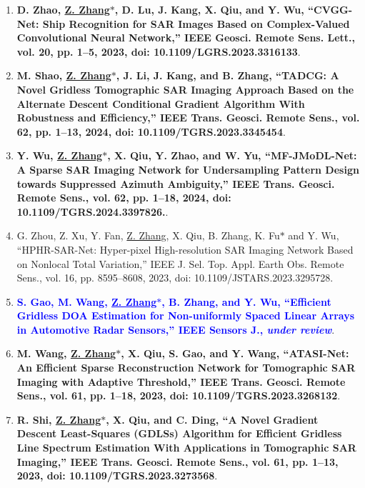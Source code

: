 \documentclass[paper=a4,fontsize=11pt]{scrartcl}
\begin{document}
\begin{enumerate}

\item \textbf{D. Zhao, \underline{Z. Zhang$\ast$}, D. Lu, J. Kang, X. Qiu, and Y. Wu, ``CVGG-Net: Ship Recognition for SAR Images Based on Complex-Valued Convolutional Neural Network,'' IEEE Geosci. Remote Sens. Lett., vol. 20, pp. 1–5, 2023, doi: 10.1109/LGRS.2023.3316133}.​

\item \textbf{M. Shao, \underline{Z. Zhang$\ast$}, J. Li, J. Kang, and B. Zhang, ``TADCG: A Novel Gridless Tomographic SAR Imaging Approach Based on the Alternate Descent Conditional Gradient Algorithm With Robustness and Efficiency,'' IEEE Trans. Geosci. Remote Sens., vol. 62, pp. 1–13, 2024, doi: 10.1109/TGRS.2023.3345454}.

\item \textbf{Y. Wu, \underline{Z. Zhang$\ast$}, X. Qiu, Y. Zhao, and W. Yu, ``MF-JMoDL-Net: A Sparse SAR Imaging Network for Undersampling Pattern Design towards Suppressed Azimuth Ambiguity,'' IEEE Trans. Geosci. Remote Sens., vol. 62, pp. 1–18, 2024, doi: 10.1109/TGRS.2024.3397826.}.

\item G. Zhou, Z. Xu, Y. Fan, \underline{Z. Zhang}, X. Qiu, B. Zhang, K. Fu$\ast$ and Y. Wu, ``HPHR-SAR-Net: Hyper-pixel High-resolution SAR Imaging Network Based on Nonlocal Total Variation,'' IEEE J. Sel. Top. Appl. Earth Obs. Remote Sens., vol. 16, pp. 8595–8608, 2023, doi: 10.1109/JSTARS.2023.3295728.

\item \textcolor{blue}{\textbf{S. Gao, M. Wang, \underline{Z. Zhang$\ast$}, B. Zhang, and Y. Wu, ``Efficient Gridless DOA Estimation for Non-uniformly Spaced Linear Arrays in Automotive Radar Sensors,'' IEEE Sensors J., \emph{under review}}}.

\item \textbf{M. Wang, \underline{Z. Zhang$\ast$}, X. Qiu, S. Gao, and Y. Wang, ``ATASI-Net: An Efficient Sparse Reconstruction Network for Tomographic SAR Imaging with Adaptive Threshold,'' IEEE Trans. Geosci. Remote Sens., vol. 61, pp. 1–18, 2023, doi: 10.1109/TGRS.2023.3268132}.	

\item \textbf{R. Shi, \underline{Z. Zhang$\ast$}, X. Qiu, and C. Ding, ``A Novel Gradient Descent Least-Squares (GDLSs) Algorithm for Efficient Gridless Line Spectrum Estimation With Applications in Tomographic SAR Imaging,'' IEEE Trans. Geosci. Remote Sens., vol. 61, pp. 1–13, 2023, doi: 10.1109/TGRS.2023.3273568}.


\end{enumerate}
\end{document}

